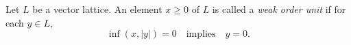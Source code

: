 Let $L$ be a vector lattice. An element $x \geq 0$ of $L$ is called a \emph{weak order unit} if for each $y \in L$,
$$
\inf(x, |y|) = 0 \quad \text{implies} \quad y = 0.
$$

